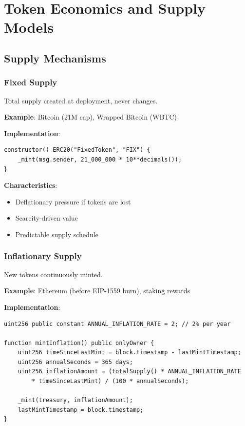 \documentclass[11pt,a4paper]{article}
\begin{document}
\section{Token Economics and Supply Models}

\subsection{Supply Mechanisms}

\subsubsection{Fixed Supply}

Total supply created at deployment, never changes.

\textbf{Example}: Bitcoin (21M cap), Wrapped Bitcoin (WBTC)

\textbf{Implementation}:
\begin{lstlisting}[language=Solidity]
constructor() ERC20("FixedToken", "FIX") {
    _mint(msg.sender, 21_000_000 * 10**decimals());
}
\end{lstlisting}

\textbf{Characteristics}:
\begin{itemize}
  \item Deflationary pressure if tokens are lost
  \item Scarcity-driven value
  \item Predictable supply schedule
\end{itemize}

\subsubsection{Inflationary Supply}

New tokens continuously minted.

\textbf{Example}: Ethereum (before EIP-1559 burn), staking rewards

\textbf{Implementation}:
\begin{lstlisting}[language=Solidity]
uint256 public constant ANNUAL_INFLATION_RATE = 2; // 2% per year

function mintInflation() public onlyOwner {
    uint256 timeSinceLastMint = block.timestamp - lastMintTimestamp;
    uint256 annualSeconds = 365 days;
    uint256 inflationAmount = (totalSupply() * ANNUAL_INFLATION_RATE
        * timeSinceLastMint) / (100 * annualSeconds);

    _mint(treasury, inflationAmount);
    lastMintTimestamp = block.timestamp;
}
\end{lstlisting}
\end{document}
